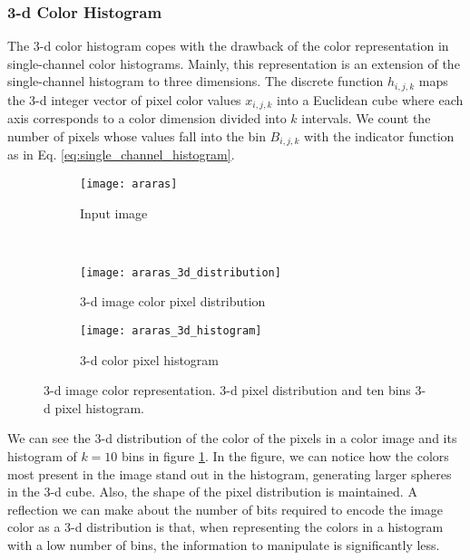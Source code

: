 \subsubsection{3-d Color Histogram}
The 3-d color histogram copes with the drawback of the color representation in single-channel color histograms. Mainly, this representation is an extension of the single-channel histogram to three dimensions. The discrete function $h_{i, j, k}$ maps the 3-d integer vector of pixel color values $x_{i, j, k}$ into a Euclidean cube where each axis corresponds to a color dimension divided into $k$ intervals. We count the number of pixels whose values fall into the bin $B_{i,j,k}$ with the indicator function as in Eq. \eqref{eq:single_channel_histogram}.

\begin{figure}[!ht]
    \centering
    \begin{subfigure}[b]{0.25\textwidth}
        \texttt{[image: araras]}
        \caption{Input image}
    \end{subfigure} \\
       
    \begin{subfigure}[b]{0.49\textwidth}
        \texttt{[image: araras\_3d\_distribution]}
        \caption{3-d image color pixel distribution}
    \end{subfigure} 
    \begin{subfigure}[b]{0.49\textwidth}
        \texttt{[image: araras\_3d\_histogram]}
        \caption{3-d color pixel histogram}
    \end{subfigure} 
    
    \caption{3-d image color representation. 3-d pixel distribution and ten bins 3-d pixel histogram.}\label{fig:3d_color_representation}    
\end{figure}

We can see the 3-d distribution of the color of the pixels in a color image and its histogram of $k=10$ bins in figure \ref{fig:3d_color_representation}. In the figure, we can notice how the colors most present in the image stand out in the histogram, generating larger spheres in the 3-d cube. Also, the shape of the pixel distribution is maintained. A reflection we can make about the number of bits required to encode the image color as a 3-d distribution is that, when representing the colors in a histogram with a low number of bins, the information to manipulate is significantly less. 


